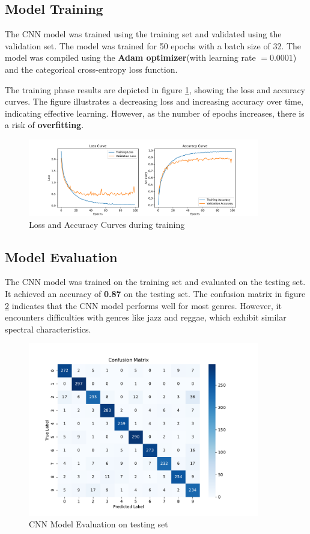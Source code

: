 \documentclass[11.5pt]{article}
\begin{document}
\subsection{Model Training}
The CNN model was trained using the training set and validated using the validation set. The model was trained for 50 epochs with a batch size of 32. The model was compiled using the \textbf{Adam optimizer}(with learning rate $=0.0001$) and the categorical cross-entropy loss function.

The training phase results are depicted in figure \ref{fig:loss_accuracy}, showing the loss and accuracy curves. The figure illustrates a decreasing loss and increasing accuracy over time, indicating effective learning. However, as the number of epochs increases, there is a risk of \textbf{overfitting}.
\begin{figure}[H]
    \centering
    \includegraphics[width=0.9\textwidth]{graphics/loss_accuracy.pdf}
    \caption{Loss and Accuracy Curves during training}
    \label{fig:loss_accuracy}
\end{figure}

\subsection{Model Evaluation}
The CNN model was trained on the training set and evaluated on the testing set. It achieved an accuracy of \textbf{0.87} on the testing set. The confusion matrix in figure \ref{fig:cnn_evaluation} indicates that the CNN model performs well for most genres. However, it encounters difficulties with genres like jazz and reggae, which exhibit similar spectral characteristics.
\begin{figure}[H]
    \centering
    \includegraphics[width=0.9\textwidth]{graphics/cnn_evaluation.pdf}
    \caption{CNN Model Evaluation on testing set}
    \label{fig:cnn_evaluation}
\end{figure}
\end{document}
